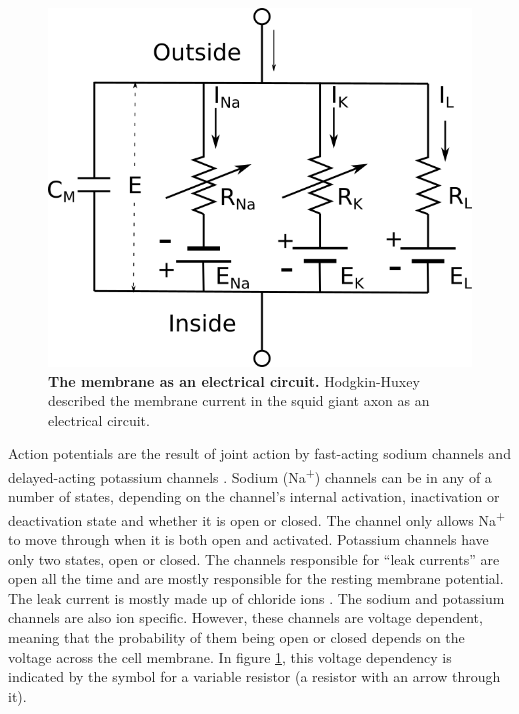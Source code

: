 \begin{figure}[H]
	\centering
		\includegraphics[width=\columnwidth]{graphics/HodgkinHuxley.png}
		\caption[The membrane as an electrical circuit.]{\textbf{The membrane as an electrical circuit.} Hodgkin-Huxey described the membrane current in the squid giant axon as an electrical circuit. \cite{Hodgkin1952a}}
		\label{fig:circuit}
\end{figure}

Action potentials are the result of joint action by fast-acting sodium channels and delayed-acting potassium channels \cite{Beckerman2005}.
Sodium (Na\textsuperscript{+}) channels can be in any of a number of states, depending on the channel's internal activation, inactivation or deactivation state and whether it is open or closed. The channel only allows Na\textsuperscript{+} to move through when it is both open and activated. Potassium channels have only two states, open or closed. The channels responsible for ``leak currents'' are open all the time and are mostly responsible for the resting membrane potential. The leak current is mostly made up of chloride ions \cite{Hodgkin1952a}. The sodium and potassium channels are also ion specific. However, these channels are voltage dependent, meaning that the probability of them being open or closed depends on the voltage across the cell membrane. In figure \ref{fig:circuit}, this voltage dependency is indicated by the symbol for a variable resistor (a resistor with an arrow through it). 

